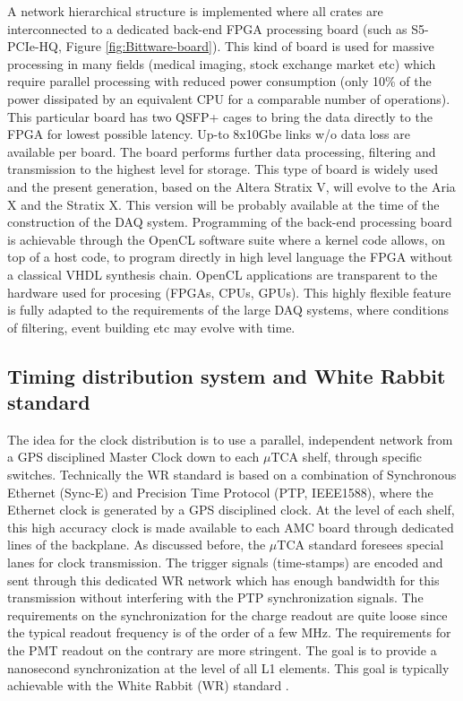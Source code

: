 A network hierarchical structure is implemented where all crates are interconnected to a dedicated back-end FPGA processing board (such as S5-PCIe-HQ, Figure \ref{fig:Bittware-board}). This kind of board is used for massive processing in many fields (medical imaging, stock exchange market etc) which require parallel processing with reduced power consumption (only 10\% of the power dissipated by an equivalent CPU for a comparable number of operations). This particular board has two QSFP+ cages to bring the data directly to the FPGA for lowest possible latency. Up-to 8x10Gbe links w/o data loss are available per board.  The board performs further data processing, filtering and transmission to the highest level for storage. This type of board is widely used and the present generation, based on the Altera Stratix V, will evolve to the Aria X and the Stratix X. This version will be probably available at the time of the construction of the DAQ system. Programming of the back-end processing board is achievable through the OpenCL software suite where a kernel code allows, on top of a host code, to program directly in high level language the FPGA without a classical VHDL synthesis chain. OpenCL applications are transparent to the hardware used for procesing (FPGAs, CPUs, GPUs). This highly flexible feature is fully adapted to the requirements of the large DAQ systems, where conditions of filtering, event building etc may evolve with time.
 
\subsection{Timing distribution system and White Rabbit standard}

The idea for the clock distribution is to use a parallel, independent network from a GPS disciplined Master Clock down to each $\mu$TCA shelf, through specific switches. Technically the WR standard is based on a combination of   Synchronous Ethernet (Sync-E) and Precision Time Protocol (PTP, IEEE1588), where the Ethernet clock is generated by a GPS disciplined clock. At the level of each shelf, this high accuracy clock is made available to each AMC board through dedicated lines of the backplane. As discussed before, the $\mu$TCA standard foresees special lanes for clock transmission. The trigger signals (time-stamps) are encoded and sent through this dedicated WR network which has enough bandwidth for this transmission without interfering with the PTP synchronization signals. The requirements on the synchronization for the charge readout are quite loose since the typical readout frequency is of the order of a few MHz. The requirements for the PMT readout on the contrary are more stringent. The goal is to provide a nanosecond synchronization at the level of all L1 elements. This goal is typically achievable with the White Rabbit (WR) standard \cite{WR-standard}.

